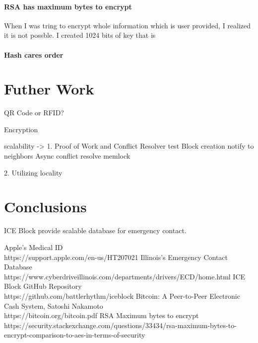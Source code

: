 \documentclass[conference]{IEEEtran}
\begin{document}
\paragraph{RSA has maximum bytes to encrypt}
When I was tring to encrypt whole information which is user provided,
I realized it is not possble.\cite{r5} I created 1024 bits of key that is 


\paragraph{Hash cares order}

\section{Futher Work}


QR Code or RFID?


Encryption


scalability -> 1. Proof of Work and Conflict Resolver test
                    Block creation notify to neighbors
                    Async conflict resolve
                    memlock

                2. Utilizing locality



\section{Conclusions}
ICE Block provide scalable database for emergency contact.




\begin{thebibliography}{00}
     Apple's Medical ID\\
    https://support.apple.com/en-us/HT207021
     Illinois's Emergency Contact Database\\
    https://www.cyberdriveillinois.com/departments/drivers/ECD/home.html
     ICE Block GitHub Repository\\
    https://github.com/battlerhythm/iceblock
     Bitcoin: A Peer-to-Peer Electronic Cash System, Satoshi Nakamoto \\
    https://bitcoin.org/bitcoin.pdf
     RSA Maximum bytes to encrypt\\
    https://security.stackexchange.com/questions/33434/rsa-maximum-bytes-to-encrypt-comparison-to-aes-in-terms-of-security



\end{thebibliography}
\end{document}
